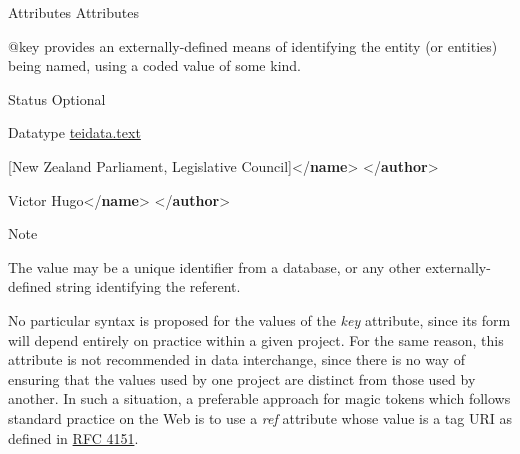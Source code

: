 \begin{reflist}
    \item[{Attributes}]
  Attributes\hfil\\[-10pt]\begin{sansreflist}
    \item[@key]
  provides an externally-defined means of identifying the entity (or entities) being named, using a coded value of some kind.
\begin{reflist}
    \item[{Status}]
  Optional
    \item[{Datatype}]
  \hyperref[TEI.teidata.text]{teidata.text}
    \item[]\mbox{}\newline 
{}[New Zealand Parliament, Legislative Council]{</\textbf{name}>}\mbox{}\newline 
{</\textbf{author}>}
    \item[]\mbox{}\newline 
{}Victor Hugo{</\textbf{name}>}\mbox{}\newline 
{</\textbf{author}>}
    \item[{Note}]
  \par
The value may be a unique identifier from a database, or any other externally-defined string identifying the referent. \par
No particular syntax is proposed for the values of the {\itshape key} attribute, since its form will depend entirely on practice within a given project. For the same reason, this attribute is not recommended in data interchange, since there is no way of ensuring that the values used by one project are distinct from those used by another. In such a situation, a preferable approach for magic tokens which follows standard practice on the Web is to use a {\itshape ref} attribute whose value is a tag URI as defined in \hyperref[RFC4151]{RFC 4151}.

\end{reflist}
\end{sansreflist}
\end{reflist}
